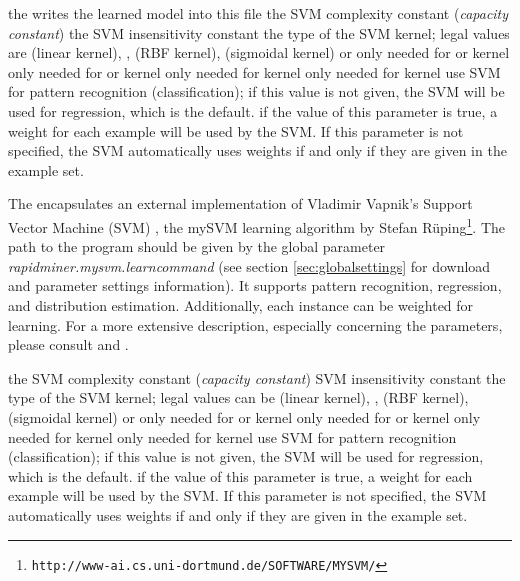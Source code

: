 \learnerio

\begin{parameters}
 the  writes the learned model into
this file
\reqpar[C] the SVM complexity constant ({\em capacity constant}) 
\reqpar[epsilon] the {SVM} insensitivity constant
\reqpar[type] the type of the {SVM} kernel; 
legal values are 
 (linear kernel), 
, 
 ({RBF} kernel), 
 (sigmoidal kernel) or 
\optpar[degree] only needed for  or  kernel
\optpar[gamma] only needed for  or  kernel
\optpar[a] only needed for  kernel
\optpar[b] only needed for  kernel
\optpar[pattern] use SVM for pattern recognition (classification); 
if this value is not given, the SVM will be used for regression, which is the default.
 if the value of this parameter is true, 
a weight for each example will be used by the SVM. If this parameter is not specified, 
the SVM automatically uses weights if and only if they are given in the example set.
\end{parameters}


\opdescr The  encapsulates an external implementation of Vladimir Vapnik's
Support Vector Machine (SVM) \cite{Vapnik/98a}, the mySVM learning algorithm by 
Stefan R\"uping\footnote{\texttt{http://www-ai.cs.uni-dortmund.de/SOFTWARE/MYSVM/}}. 
   The path to the program should be given by the global parameter {\em rapidminer.mysvm.learncommand}
(see section \ref{sec:globalsettings} for download and parameter settings information). 
   It supports pattern recognition, regression, and distribution estimation. 
Additionally, each instance can be weighted for learning. 
For a more extensive description, especially concerning the parameters,
please consult \cite{Rueping/2000a} and \cite{Vapnik/98a}.




\applierio

\begin{parameters}
\reqpar[C] the SVM complexity constant ({\em capacity constant}) 
\reqpar[epsilon] SVM insensitivity constant
\reqpar[type] the type of the SVM kernel; 
legal values can be 
 (linear kernel),
, 
 ({RBF} kernel), 
 (sigmoidal kernel) or 
\optpar[degree] only needed for  or  kernel
\optpar[gamma] only needed for  or  kernel
\optpar[a] only needed for  kernel
\optpar[b] only needed for  kernel
\optpar[pattern] use SVM for pattern recognition (classification); 
if this value is not given, the SVM will be used for regression, which is the default.
 if the value of this parameter is true, 
a weight for each example will be used by the SVM. If this parameter is not specified, 
the SVM automatically uses weights if and only if they are given in the example set.
\end{parameters}

